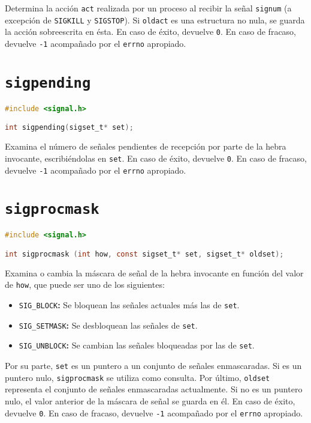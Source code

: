 Determina la acción \texttt{act} realizada por un proceso al recibir la señal \texttt{signum} (a excepción de \texttt{SIGKILL} y \texttt{SIGSTOP}).
Si \texttt{oldact} es una estructura no nula, se guarda la acción sobreescrita en ésta.
En caso de éxito, devuelve \texttt{0}.
En caso de fracaso, devuelve \texttt{-1} acompañado por el \texttt{errno} apropiado.

\section{\texttt{sigpending}}\label{sigpending}

\begin{lstlisting}[language=C]
#include <signal.h>

int sigpending(sigset_t* set);
\end{lstlisting}

Examina el número de señales pendientes de recepción por parte de la hebra invocante, escribiéndolas en \texttt{set}.
En caso de éxito, devuelve \texttt{0}.
En caso de fracaso, devuelve \texttt{-1} acompañado por el \texttt{errno} apropiado.

\section{\texttt{sigprocmask}}\label{sigprocmask}

\begin{lstlisting}[language=C]
#include <signal.h>

int sigprocmask (int how, const sigset_t* set, sigset_t* oldset);
\end{lstlisting}

Examina o cambia la máscara de señal de la hebra invocante en función del valor de \texttt{how}, que puede ser uno de los siguientes:

\begin{itemize}
	\item\texttt{SIG\_BLOCK}\textbf{:} Se bloquean las señales actuales más las de \texttt{set}.
	\item\texttt{SIG\_SETMASK}\textbf{:} Se desbloquean las señales de \texttt{set}.
	\item\texttt{SIG\_UNBLOCK}\textbf{:} Se cambian las señales bloqueadas por las de \texttt{set}.
\end{itemize}

Por su parte, \texttt{set} es un puntero a un conjunto de señales enmascaradas.
Si es un puntero nulo, \texttt{sigprocmask} se utiliza como consulta.
Por último, \texttt{oldset} representa el conjunto de señales enmascaradas actualmente.
Si no es un puntero nulo, el valor anterior de la máscara de señal se guarda en él.
En caso de éxito, devuelve \texttt{0}.
En caso de fracaso, devuelve \texttt{-1} acompañado por el \texttt{errno} apropiado.

